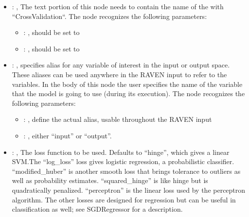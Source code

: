 \begin{itemize}
\begin{itemize}
        \item {}: ,
          List of IDs of features/variables to include in the transformation process.

        \item {}: ,
          Which space to search? Target or Feature?
      \end{itemize}

    \item {}: ,
      The text portion of this node needs to contain the name of the  with
               ``CrossValidation``.
      The  node recognizes the following parameters:
        \begin{itemize}
          \item {}: ,
            should be set to 
          \item {}: ,
            should be set to 
      \end{itemize}

    \item {}: ,
      specifies alias for         any variable of interest in the input or output space. These
      aliases can be used anywhere in the RAVEN input to         refer to the variables. In the body
      of this node the user specifies the name of the variable that the model is going to use
      (during its execution).
      The  node recognizes the following parameters:
        \begin{itemize}
          \item {}: ,
            define the actual alias, usable throughout the RAVEN input
          \item {}: ,
            either ``input'' or ``output''.
      \end{itemize}

    \item {}: ,
      The loss function to be used. Defaults to ``hinge'', which gives a linear SVM.The
      ``log\_loss'' loss gives logistic regression, a
      probabilistic classifier. ``modified\_huber'' is another smooth loss that brings tolerance to
      outliers as well as probability estimates.
      ``squared\_hinge'' is like hinge but is quadratically penalized. ``perceptron'' is the linear
      loss used by the perceptron algorithm.                                                  The
      other losses are designed for regression but can be useful in classification as well; see
      SGDRegressor for a description.


\end{itemize}
